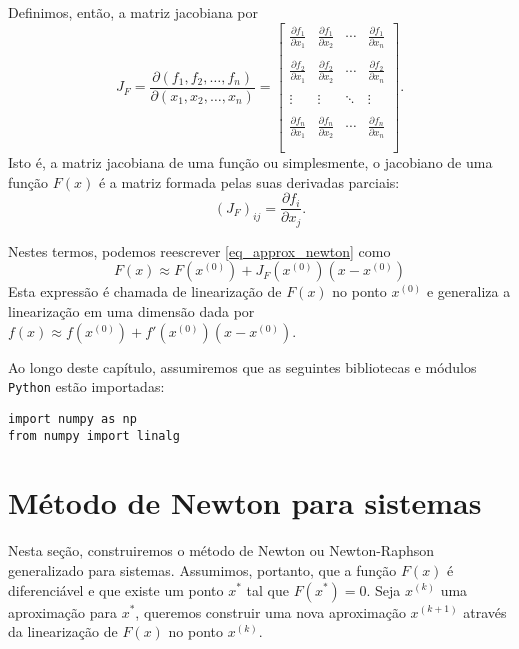 Definimos, então, a matriz jacobiana por
\begin{equation}J_F= \frac{\partial(f_1,f_2,\ldots,f_n)}{\partial(x_1,x_2,\ldots,x_n)}=\left[
\begin{array}{ccccc}
\frac{\partial f_1}{\partial x_1}&\frac{\partial f_1}{\partial x_2}&\cdots&\frac{\partial f_1}{\partial x_n}\\~\\
\frac{\partial f_2}{\partial x_1}&\frac{\partial f_2}{\partial x_2}&\cdots&\frac{\partial f_2}{\partial x_n}\\~\\
\vdots&\vdots&\ddots&\vdots\\~\\
\frac{\partial f_n}{\partial x_1}&\frac{\partial f_n}{\partial x_2}&\cdots&\frac{\partial f_n}{\partial x_n}\\~\\
\end{array}
\right].
\end{equation}
Isto é, a matriz jacobiana de uma função ou simplesmente, o jacobiano de uma função $F(x)$ é a matriz formada pelas suas derivadas parciais:
\begin{equation} \left(J_F\right)_{ij}=\frac{\partial f_i}{\partial x_j}. \end{equation}

Nestes termos, podemos reescrever \eqref{eq_approx_newton} como
\begin{equation} F(x)\approx F(x^{(0)}) + J_F(x^{(0)}) (x-x^{(0)}) \end{equation}
Esta expressão é chamada de linearização de $F(x)$ no ponto $x^{(0)}$ e generaliza a linearização em uma dimensão dada por $f(x)\approx f(x^{(0)})+f'(x^{(0)}) (x-x^{(0)})$.

\ifispython
Ao longo deste capítulo, assumiremos que as seguintes bibliotecas e módulos \verb+Python+ estão importadas:
\begin{verbatim}
import numpy as np
from numpy import linalg
\end{verbatim}
\fi

\section{Método de  Newton para sistemas}

Nesta seção, construiremos o método de Newton ou Newton-Raphson generalizado para sistemas. Assumimos, portanto, que a função $F(x)$ é diferenciável e que existe um ponto $x^*$ tal que $F(x^*)=0$. Seja $x^{(k)}$ uma aproximação para $x^*$, queremos construir uma nova aproximação $x^{(k+1)}$ através da linearização de $F(x)$ no ponto $x^{(k)}$.

